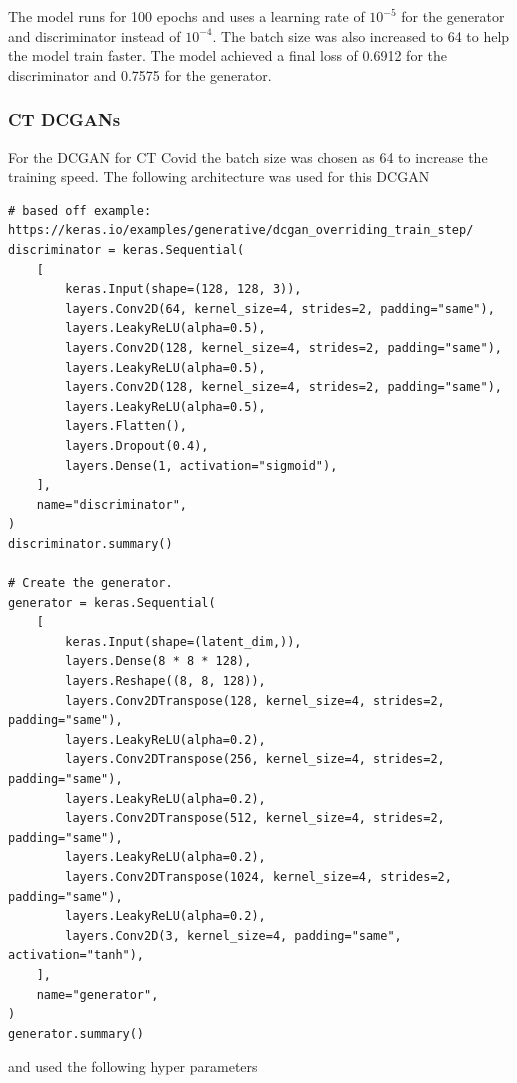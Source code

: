 The model runs for 100 epochs and uses a learning rate of $10^{-5}$ for the generator and discriminator instead of $10^{-4}$.  The batch size was also increased to 64 to help the model train faster.  The model achieved a final loss of 0.6912 for the discriminator and 0.7575 for the generator.
\subsubsection{CT DCGANs}
For the DCGAN for CT Covid the batch size was chosen as 64 to increase the training speed.  The following architecture was used for this DCGAN
\begin{verbatim}
# based off example: https://keras.io/examples/generative/dcgan_overriding_train_step/
discriminator = keras.Sequential(
    [
        keras.Input(shape=(128, 128, 3)),
        layers.Conv2D(64, kernel_size=4, strides=2, padding="same"),
        layers.LeakyReLU(alpha=0.5),
        layers.Conv2D(128, kernel_size=4, strides=2, padding="same"),
        layers.LeakyReLU(alpha=0.5),
        layers.Conv2D(128, kernel_size=4, strides=2, padding="same"),
        layers.LeakyReLU(alpha=0.5),
        layers.Flatten(),
        layers.Dropout(0.4),
        layers.Dense(1, activation="sigmoid"),
    ],
    name="discriminator",
)
discriminator.summary()

# Create the generator.
generator = keras.Sequential(
    [
        keras.Input(shape=(latent_dim,)),
        layers.Dense(8 * 8 * 128),
        layers.Reshape((8, 8, 128)),
        layers.Conv2DTranspose(128, kernel_size=4, strides=2, padding="same"),
        layers.LeakyReLU(alpha=0.2),
        layers.Conv2DTranspose(256, kernel_size=4, strides=2, padding="same"),
        layers.LeakyReLU(alpha=0.2),
        layers.Conv2DTranspose(512, kernel_size=4, strides=2, padding="same"),
        layers.LeakyReLU(alpha=0.2),
        layers.Conv2DTranspose(1024, kernel_size=4, strides=2, padding="same"),
        layers.LeakyReLU(alpha=0.2),
        layers.Conv2D(3, kernel_size=4, padding="same", activation="tanh"),
    ],
    name="generator",
)
generator.summary()
\end{verbatim}
and used the following hyper parameters

